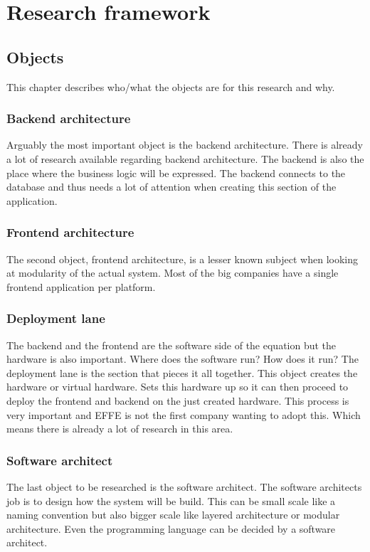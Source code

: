 \section{Research framework}

\subsection{Objects}
This chapter describes who/what the objects are for this research and why.

\subsubsection{Backend architecture}
Arguably the most important object is the backend architecture. There is already a lot of research available regarding backend architecture. The backend is also the place where the business logic will be expressed. The backend connects to the database and thus needs a lot of attention when creating this section of the application.

\subsubsection{Frontend architecture}
The second object, frontend architecture, is a lesser known subject when looking at modularity of the actual system. Most of the big companies have a single frontend application per platform.

\subsubsection{Deployment lane}
\label{sec:DeploymentLane}
The backend and the frontend are the software side of the equation but the hardware is also important. Where does the software run? How does it run? The deployment lane is the section that pieces it all together. This object creates the hardware or virtual hardware. Sets this hardware up so it can then proceed to deploy the frontend and backend on the just created hardware. This process is very important and EFFE is not the first company wanting to adopt this. Which means there is already a lot of research in this area.

\subsubsection{Software architect}
\label{sec:SoftwareArchitect}
The last object to be researched is the software architect. The software architects job is to design how the system will be build. This can be small scale like a naming convention but also bigger scale like layered architecture or modular architecture. Even the programming language can be decided by a software architect.

